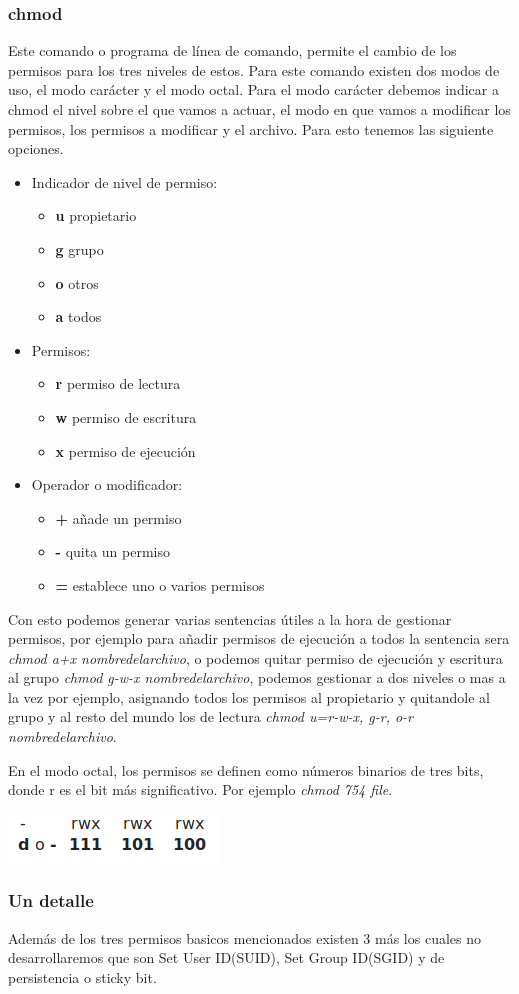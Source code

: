 \documentclass[12pt,a4paper]{article} %
\begin{document}
	\subsubsection{chmod}
	Este comando o programa de línea de comando, permite el cambio de los permisos para los tres niveles de estos. Para este comando existen dos modos de uso, el modo carácter y el modo octal. Para el modo carácter debemos indicar a chmod el nivel sobre el que vamos a actuar, el modo en que vamos a modificar los permisos, los permisos a modificar y el archivo. Para esto tenemos las siguiente opciones.\par
	 \begin{itemize}
		\item Indicador de nivel de permiso:\par
		\begin{itemize}
			\item \textbf{u} propietario
			\item \textbf{g} grupo
			\item \textbf{o} otros
			\item \textbf{a} todos
		\end{itemize}		 
		\item Permisos:
		\begin{itemize}
			\item \textbf{r} permiso de lectura
			\item \textbf{w} permiso de escritura
			\item \textbf{x} permiso de ejecución
		\end{itemize}
		\item Operador o modificador:
		\begin{itemize}
			\item \textbf{+} añade un permiso
			\item \textbf{-} quita un permiso
			\item \textbf{=} establece uno o varios permisos
		\end{itemize}
	\end{itemize}
	
	Con esto podemos generar varias sentencias útiles a la hora de gestionar permisos, por ejemplo para añadir permisos de ejecución a todos la sentencia sera \textit{chmod a+x nombredelarchivo}, o podemos quitar permiso de ejecución y escritura al grupo \textit{chmod g-w-x nombredelarchivo}, podemos gestionar a dos niveles o mas a la vez por ejemplo, asignando todos los permisos al propietario y quitandole al grupo y al resto del mundo los de lectura \textit{chmod u=r-w-x, g-r, o-r nombredelarchivo}.\par
	En el modo octal, los permisos se definen como números binarios de tres bits, donde r es el bit más significativo. Por ejemplo \textit{chmod 754 file}.\par
	\begin{center}
		\includegraphics[scale=1]{cuadrito}
	\end{center}
	
	\subsubsection{Un detalle}
	Además de los tres permisos basicos mencionados existen 3 más los cuales no desarrollaremos que son Set User ID(SUID), Set Group ID(SGID) y de persistencia o sticky bit.
\end{document}
